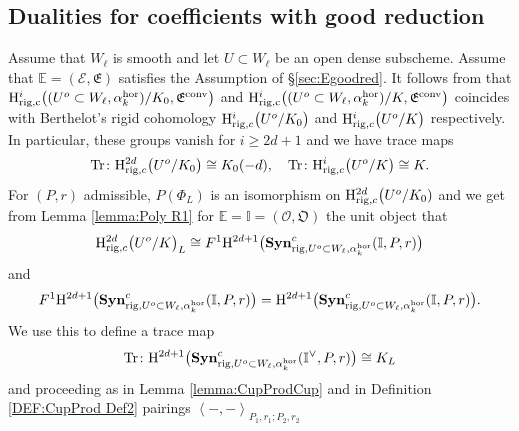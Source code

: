 \documentclass[asterisque,english]{smfart}
\begin{document}
\subsection{Dualities for coefficients with good reduction}\label{sec:DualSynGood} Assume that $W_\ell$ is smooth and let $U\subset W_\ell$ be an open dense subscheme. Assume that $\mathbb{E}=(\mathcal{E},\mathfrak{E})$ satisfies the Assumption of \S \ref{sec:Egoodred}. It follows from \cite[Prop. 3.15]{EY} that $\mathrm{H}^i_{\rm rig,c}\bigl((U^o\subset W_\ell,\alpha_k^{\rm hor})/K_0, \mathfrak{E}^{\rm conv}\bigr)$ and $\mathrm{H}^i_{\rm rig,c}\bigl((U^o\subset W_\ell,\alpha_k^{\rm hor})/K, \mathfrak{E}^{\rm conv}\bigr)$ coincides with Berthelot's rigid cohomology $\mathrm{H}^i_{{\rm rig},c}\bigl(U^o/K_0\bigr)$ and $\mathrm{H}^i_{{\rm rig},c}\bigl(U^o/K\bigr)$ respectively. In particular, these groups vanish for $i\geq 2d+1$ and we have trace maps $$\mathrm{Tr}\colon \mathrm{H}^{2d}_{{\rm rig},c}\bigl(U^o/K_0\bigr)\cong K_0(-d), \quad \mathrm{Tr}\colon \mathrm{H}^i_{{\rm rig},c}\bigl(U^o/K\bigr)\cong K. $$
For $\left( P,r\right) $ admissible, $P(\Phi_L)$ is an isomorphism on $\mathrm{H}^{2d}_{{\rm rig},c}\bigl(U^o/K_0) $ and we get from Lemma \ref{lemma:Poly R1} for $\mathbb{E}=\mathbb{I}=(\mathcal{O},\mathfrak{O})$  the unit object that 
$$\mathrm{H}^{2d}_{{\rm rig},c}\bigl(U^o/K\bigr)_L\cong F^1\mathrm{H}^{2d+1}\bigl(\mathbf{Syn}^c_{{\rm rig},U^o\subset W_\ell,\alpha_k^{\rm hor}}(\mathbb{I},P,r)\bigr)$$and $$F^1\mathrm{H}^{2d+1}\bigl(\mathbf{Syn}^c_{{\rm rig},U^o\subset W_\ell,\alpha_k^{\rm hor}}(\mathbb{I},P,r)\bigr)=\mathrm{H}^{2d+1}\bigl(\mathbf{Syn}^c_{{\rm rig},U^o\subset W_\ell,\alpha_k^{\rm hor}}(\mathbb{I},P,r)\bigr) .$$We use this to define a trace map $$\mathrm{Tr} \colon \mathrm{H}^{2d+1}\bigl(\mathbf{Syn}^c_{{\rm rig},U^o\subset W_\ell,\alpha_k^{\rm hor}}(\mathbb{I}^\vee,P,r)\bigr)\cong K_L$$and proceeding as in Lemma \ref{lemma:CupProdCup} and  in Definition \ref{DEF:CupProd Def2} pairings $\left\langle -,-\right\rangle_{P_{1},r_{1};P_{2},r_{2}}$
\end{document}

